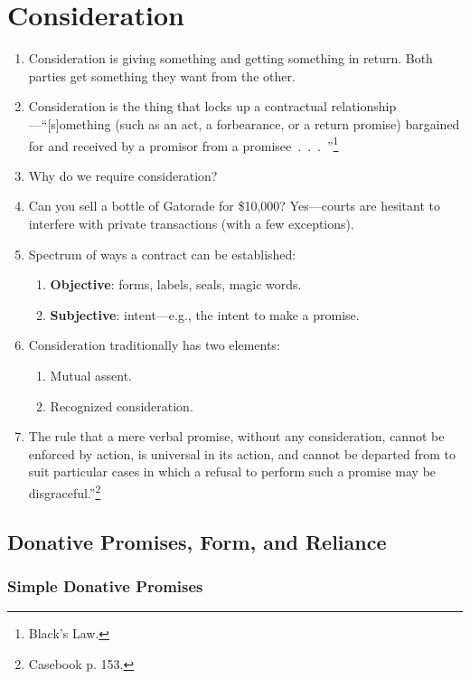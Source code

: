 \section{Consideration}

\begin{enumerate}
    \item Consideration is giving something and getting something in return. 
    Both parties get something they want from the other.
    \item Consideration is the thing that locks up a contractual 
    relationship---``[s]omething (such as an act, a forbearance, or a return 
    promise) bargained for and received by a promisor from a 
    promisee~.~.~.~''\footnote{Black's Law.}
    \item Why do we require consideration?
    \item Can you sell a bottle of Gatorade for \$10,000? Yes---courts are 
    hesitant to interfere with private transactions (with a few exceptions).
    \item Spectrum of ways a contract can be established:
    \begin{enumerate}
        \item \textbf{Objective}: forms, labels, seals, magic words.
        \item \textbf{Subjective}: intent---e.g., the intent to make a 
        promise.
    \end{enumerate}
    \item Consideration traditionally has two elements:
    \begin{enumerate}
        \item Mutual assent.
        \item Recognized consideration.
    \end{enumerate}
    \item The rule that a mere verbal promise, without any consideration, 
    cannot be enforced by action, is universal in its action, and cannot be 
    departed from to suit particular cases in which a refusal to perform such 
    a promise may be disgraceful.''\footnote{Casebook p. 153.}
\end{enumerate}

\subsection{Donative Promises, Form, and Reliance}

\subsubsection{Simple Donative Promises}

